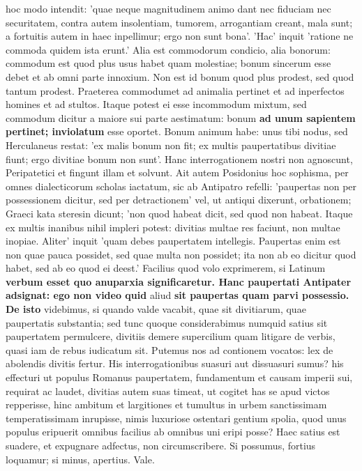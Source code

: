 hoc modo intendit: 'quae neque magnitudinem animo dant nec fiduciam nec securitatem, contra autem insolentiam, tumorem, arrogantiam creant, mala sunt; a fortuitis autem in haec inpellimur; ergo non sunt bona'. 'Hac' inquit 'ratione ne commoda quidem ista erunt.' Alia est commodorum condicio, alia bonorum: commodum est quod plus usus habet quam molestiae; bonum sincerum esse debet et ab omni parte innoxium. Non est id bonum quod plus prodest, sed quod tantum prodest. Praeterea commodumet ad animalia pertinet et ad inperfectos homines et ad stultos. Itaque potest ei esse incommodum mixtum, sed commodum dicitur a maiore sui parte aestimatum: bonum \textbf{ad unum sapientem pertinet; inviolatum} esse oportet. Bonum animum habe: unus tibi nodus, sed Herculaneus restat: 'ex malis bonum non fit; ex multis paupertatibus divitiae fiunt; ergo divitiae bonum non sunt'. Hanc interrogationem nostri non agnoscunt, Peripatetici et fingunt illam et solvunt. Ait autem Posidonius hoc sophisma, per omnes dialecticorum scholas iactatum, sic ab Antipatro refelli: 'paupertas non per possessionem dicitur, sed per detractionem' vel, ut antiqui dixerunt, orbationem; Graeci kata steresin dicunt; 'non quod habeat dicit, sed quod non habeat. Itaque ex multis inanibus nihil impleri potest: divitias multae res faciunt, non multae inopiae. Aliter' inquit 'quam debes paupertatem intellegis. Paupertas enim est non quae pauca possidet, sed quae multa non possidet; ita non ab eo dicitur quod habet, sed ab eo quod ei deest.' Facilius quod volo exprimerem, si Latinum \textbf{verbum \textbf{esset quo anuparxia significaretur. \textbf{Hanc}} paupertati \textbf{Antipater adsignat: ego non} video quid} aliud \textbf{sit \textbf{paupertas quam parvi possessio. De isto}} videbimus, si quando valde vacabit, quae sit divitiarum, quae paupertatis substantia; sed tunc quoque considerabimus numquid satius sit paupertatem permulcere, divitiis demere supercilium quam litigare de verbis, quasi iam de rebus iudicatum sit. Putemus nos ad contionem vocatos: lex de abolendis divitis fertur. His interrogationibus suasuri aut dissuasuri sumus? his effecturi ut populus Romanus paupertatem, fundamentum et causam imperii sui, requirat ac laudet, divitias autem suas timeat, ut cogitet has se apud victos repperisse, hinc ambitum et largitiones et tumultus in urbem sanctissimam temperatissimam inrupisse, nimis luxuriose ostentari gentium spolia, quod unus populus eripuerit omnibus facilius ab omnibus uni eripi posse? Haec satius est suadere, et expugnare adfectus, non circumscribere. Si possumus, fortius loquamur; si minus, apertius. Vale. 

